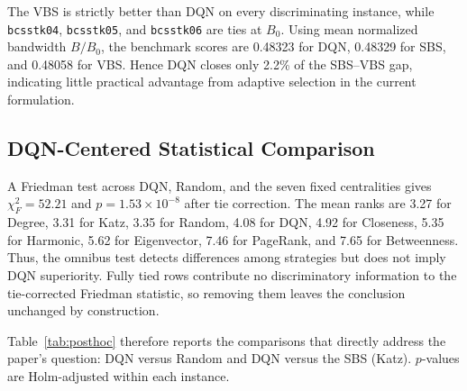 \documentclass[runningheads]{llncs}
\begin{document}
The VBS is strictly better than DQN on every discriminating instance, while \texttt{bcsstk04}, \texttt{bcsstk05}, and \texttt{bcsstk06} are ties at $B_0$. Using mean normalized bandwidth $B/B_0$, the benchmark scores are 0.48323 for DQN, 0.48329 for SBS, and 0.48058 for VBS. Hence DQN closes only 2.2\% of the SBS--VBS gap, indicating little practical advantage from adaptive selection in the current formulation.

\subsection{DQN-Centered Statistical Comparison}

A Friedman test across DQN, Random, and the seven fixed centralities gives $\chi_F^2=52.21$ and $p=1.53\times10^{-8}$ after tie correction. The mean ranks are 3.27 for Degree, 3.31 for Katz, 3.35 for Random, 4.08 for DQN, 4.92 for Closeness, 5.35 for Harmonic, 5.62 for Eigenvector, 7.46 for PageRank, and 7.65 for Betweenness. Thus, the omnibus test detects differences among strategies but does not imply DQN superiority. Fully tied rows contribute no discriminatory information to the tie-corrected Friedman statistic, so removing them leaves the conclusion unchanged by construction.

Table~\ref{tab:posthoc} therefore reports the comparisons that directly address the paper's question: DQN versus Random and DQN versus the SBS (Katz). $p$-values are Holm-adjusted within each instance.
\end{document}
